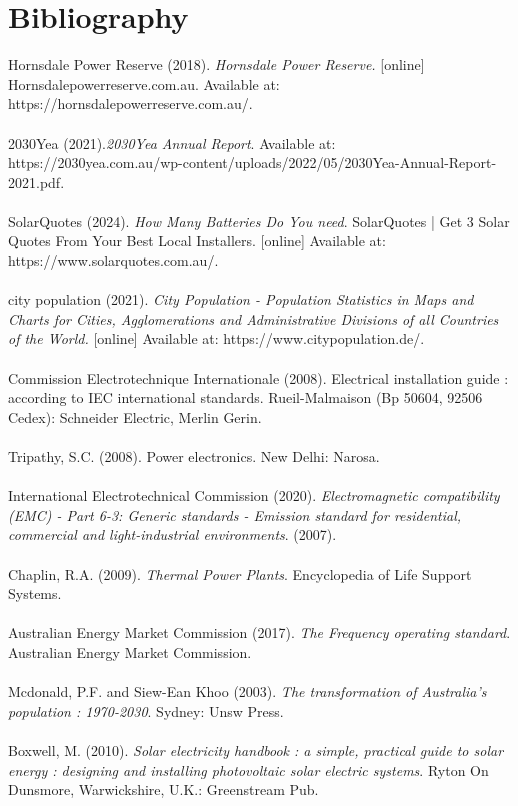 \documentclass{article}
\begin{document}
\section*{Bibliography}
Hornsdale Power Reserve (2018). \textit{Hornsdale Power Reserve.} [online] Hornsdalepowerreserve.com.au. Available at: https://hornsdalepowerreserve.com.au/.\\
\\
2030Yea (2021).\textit{2030Yea Annual Report}. Available at: https://2030yea.com.au/wp-content/uploads/2022/05/2030Yea-Annual-Report-2021.pdf.\\
\\
SolarQuotes (2024). \textit{How Many Batteries Do You need}. SolarQuotes | Get 3 Solar Quotes From Your Best Local Installers. [online] Available at: https://www.solarquotes.com.au/.\\
\\
city population (2021). \textit{City Population - Population Statistics in Maps and Charts for Cities, Agglomerations and Administrative Divisions of all Countries of the World.} [online] Available at: https://www.citypopulation.de/.\\
\\
Commission Electrotechnique Internationale (2008). Electrical installation guide : according to IEC international standards. Rueil-Malmaison (Bp 50604, 92506 Cedex): Schneider Electric, Merlin Gerin.\\
\\
Tripathy, S.C. (2008). Power electronics. New Delhi: Narosa.\\
\\
International Electrotechnical Commission (2020). \textit{Electromagnetic compatibility (EMC) - Part 6-3: Generic standards - Emission standard for residential, commercial and light-industrial environments}. (2007).\\
\\
Chaplin, R.A. (2009). \textit{Thermal Power Plants}. Encyclopedia of Life Support Systems.\\
\\
Australian Energy Market Commission (2017). \textit{The Frequency operating standard}. Australian Energy Market Commission.\\
\\
Mcdonald, P.F. and Siew-Ean Khoo (2003). \textit{The transformation of Australia’s population : 1970-2030}. Sydney: Unsw Press.\\
\\
Boxwell, M. (2010). \textit{Solar electricity handbook : a simple, practical guide to solar energy : designing and installing photovoltaic solar electric systems}. Ryton On Dunsmore, Warwickshire, U.K.: Greenstream Pub.\\
\end{document}
